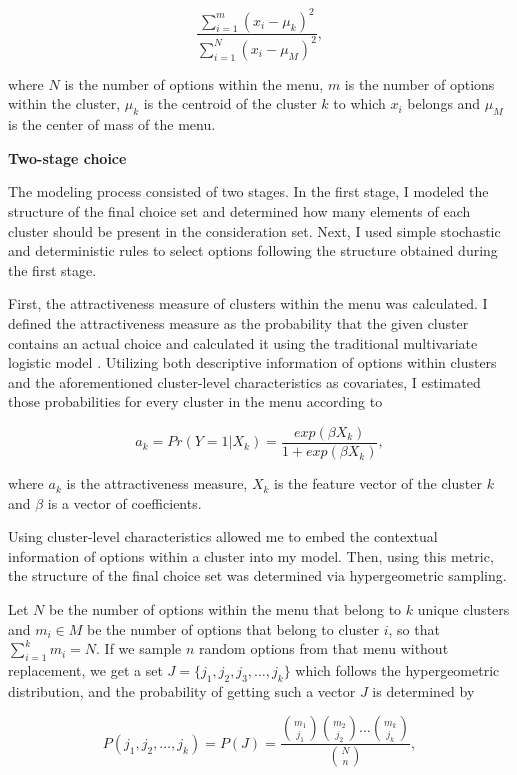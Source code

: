 \documentclass[a4paper,12pt]{article}
\begin{document}
$$\frac{\sum_{i=1}^{m}{({x_i -\mu_k})}^2}{{\sum_{i=1}^{N}{(x_i- \mu_M)}^2}} ,$$

where $N$ is the number of options within the menu, $m$ is the number of options within the cluster, $\mu_k$ is the centroid of the cluster $k$ to which $x_i$ belongs and $\mu_M$ is the center of mass of the menu.


\textbf{Two-stage choice}\label{hypergeometricDefinitionText}
 
The modeling process consisted of two stages. In the first stage, I modeled the structure of the final choice set and determined how many elements of each cluster should be present in the consideration set. Next, I used simple stochastic and deterministic rules to select options following the structure obtained during the first stage.

First, the attractiveness measure of clusters within the menu was calculated. I defined the attractiveness measure as the probability that the given cluster contains an actual choice and calculated it using the traditional multivariate logistic model \citep{ben1985discrete}. Utilizing both descriptive information of options within clusters and the aforementioned cluster-level characteristics as covariates, I estimated those probabilities for every cluster in the menu according to

\begin{equation}\label{eq:multivariateLogit}
    a_k = Pr(Y=1|X_k)=\frac{exp(\beta  X_k)}{1 + exp(\beta X_k)},
\end{equation}

where $a_k$ is the attractiveness measure, $X_k$ is the feature vector of the cluster $k$ and $\beta$ is a vector of coefficients.
 
Using cluster-level characteristics allowed me to embed the contextual information of options within a cluster into my model. Then, using this metric, the structure of the final choice set was determined via hypergeometric sampling. 

Let $N$ be the number of options within the menu that belong to $k$ unique clusters and $m_i\in M$ be the number of options that belong to cluster $i$, so that $\sum_{i=1}^{k}m_i= N$. If we sample $n$ random options from that menu without replacement, we get a set $J = \{j_1,j_2,j_3, \dots,j_k\}$ which follows the hypergeometric distribution, and the probability of getting such a vector $J$ is determined by

\begin{equation}\label{eq:hypergeometric1}
    P(j_1, j_2,\ldots, j_k) = P(J) =\frac{{m_1\choose j_1} {m_2\choose j_2} \dots {m_k\choose j_k}}{{N\choose n}} ,
\end{equation}
\end{document}
